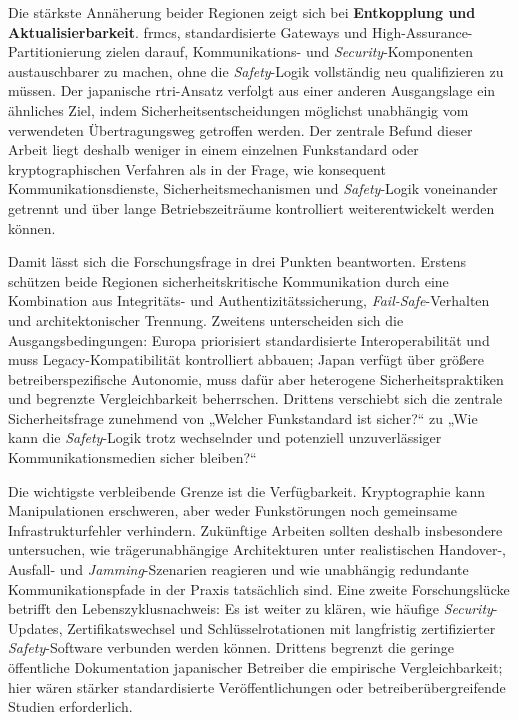\documentclass[runningheads]{res/llncs}
\begin{document}
Die stärkste Annäherung beider Regionen zeigt sich bei \textbf{Entkopplung und Aktualisierbarkeit}. \gls{frmcs}, standardisierte Gateways und High-Assurance-Partitionierung zielen darauf, Kommunikations- und \textit{Security}-Komponenten austauschbarer zu machen, ohne die \textit{Safety}-Logik vollständig neu qualifizieren zu müssen. Der japanische \gls{rtri}-Ansatz verfolgt aus einer anderen Ausgangslage ein ähnliches Ziel, indem Sicherheitsentscheidungen möglichst unabhängig vom verwendeten Übertragungsweg getroffen werden. Der zentrale Befund dieser Arbeit liegt deshalb weniger in einem einzelnen Funkstandard oder kryptographischen Verfahren als in der Frage, wie konsequent Kommunikationsdienste, Sicherheitsmechanismen und \textit{Safety}-Logik voneinander getrennt und über lange Betriebszeiträume kontrolliert weiterentwickelt werden können.

Damit lässt sich die Forschungsfrage in drei Punkten beantworten. Erstens schützen beide Regionen sicherheitskritische Kommunikation durch eine Kombination aus Integritäts- und Authentizitätssicherung, \textit{Fail-Safe}-Verhalten und architektonischer Trennung. Zweitens unterscheiden sich die Ausgangsbedingungen: Europa priorisiert standardisierte Interoperabilität und muss Legacy-Kompatibilität kontrolliert abbauen; Japan verfügt über größere betreiberspezifische Autonomie, muss dafür aber heterogene Sicherheitspraktiken und begrenzte Vergleichbarkeit beherrschen. Drittens verschiebt sich die zentrale Sicherheitsfrage zunehmend von „Welcher Funkstandard ist sicher?“ zu „Wie kann die \textit{Safety}-Logik trotz wechselnder und potenziell unzuverlässiger Kommunikationsmedien sicher bleiben?“

Die wichtigste verbleibende Grenze ist die Verfügbarkeit. Kryptographie kann Manipulationen erschweren, aber weder Funkstörungen noch gemeinsame Infrastrukturfehler verhindern. Zukünftige Arbeiten sollten deshalb insbesondere untersuchen, wie trägerunabhängige Architekturen unter realistischen Handover-, Ausfall- und \textit{Jamming}-Szenarien reagieren und wie unabhängig redundante Kommunikationspfade in der Praxis tatsächlich sind. Eine zweite Forschungslücke betrifft den Lebenszyklusnachweis: Es ist weiter zu klären, wie häufige \textit{Security}-Updates, Zertifikatswechsel und Schlüsselrotationen mit langfristig zertifizierter \textit{Safety}-Software verbunden werden können. Drittens begrenzt die geringe öffentliche Dokumentation japanischer Betreiber die empirische Vergleichbarkeit; hier wären stärker standardisierte Veröffentlichungen oder betreiberübergreifende Studien erforderlich.
\end{document}
